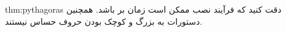     \begin{theo}{thm:pythagoras}
    {\large
    دقت کنید که فرآیند نصب ممکن است زمان بر باشد. همچنین دستورات  به بزرگ و کوچک بودن حروف حساس نیستند.
    }
    \end{theo}



    \newpage